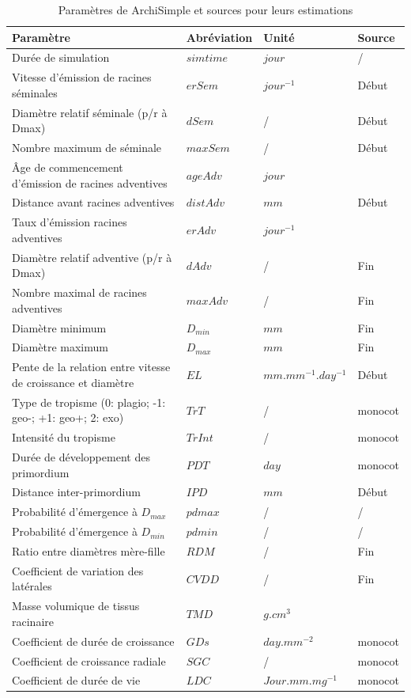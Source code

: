 \begin{table}[ht]
    \centering
    \caption{Paramètres de ArchiSimple et sources pour leurs estimations}
    \begin{tabular}{p{7.5cm}|p{2.2cm}|p{3.2cm}|p{3cm}}
        Paramètre & Abréviation & Unité & Source \\
        \hline
        Durée de simulation & $simtime$ & $jour$ & / \\
        Vitesse d'émission de racines séminales & $erSem$ & $jour^{-1}$ & Début \\
        Diamètre relatif séminale (p/r à Dmax) & $dSem$ & / & Début \\
        Nombre maximum de séminale & $maxSem$ & / & Début \\
        Âge de commencement d'émission de racines adventives & $ageAdv$ & $jour$ & \cite{chantereau_sorgho_2013} \\
        Distance avant racines adventives & $distAdv$ & $mm$ & Début \\
        Taux d'émission racines adventives & $erAdv$ & $jour^{-1}$ & \cite{kumar_goyal_how_2021} \\
        Diamètre relatif adventive (p/r à Dmax) & $dAdv$ & / & Fin \\
        Nombre maximal de racines adventives & $maxAdv$ & / & Fin \\
        Diamètre minimum & $D_{min}$ & $mm$ & Fin \\
        Diamètre maximum & $D_{max}$ & $mm$ & Fin \\
        Pente de la relation entre vitesse de croissance et diamètre & $EL$ & $mm.mm^{-1}.day^{-1}$ & Début \\
        Type de tropisme (0: plagio; -1: geo-; +1: geo+; 2: exo) & $TrT$ & / & monocot \\
        Intensité du tropisme & $TrInt$ & / & monocot \\
        Durée de développement des primordium & $PDT$ & $day$ & monocot \\
        Distance inter-primordium & $IPD$ & $mm$ & Début \\
        Probabilité d'émergence à $D_{max}$ & $pdmax$ & / & / \\
        Probabilité d'émergence à $D_{min}$ & $pdmin$ & / & / \\
        Ratio entre diamètres mère-fille & $RDM$ & / & Fin \\
        Coefficient de variation des latérales & $CVDD$ & / & Fin \\
        Masse volumique de tissus racinaire & $TMD$ & $g.cm^3$ & \cite{lamb_bioenergy_2022} \\
        Coefficient de durée de croissance & $GDs$ & $day.mm^{-2}$ & monocot \\
        Coefficient de croissance radiale & $SGC$ & / & monocot  \\
        Coefficient de durée de vie & $LDC$ & $Jour.mm.mg^{-1}$ & monocot
    \end{tabular}
    \label{tab:archisimple}
\end{table}

